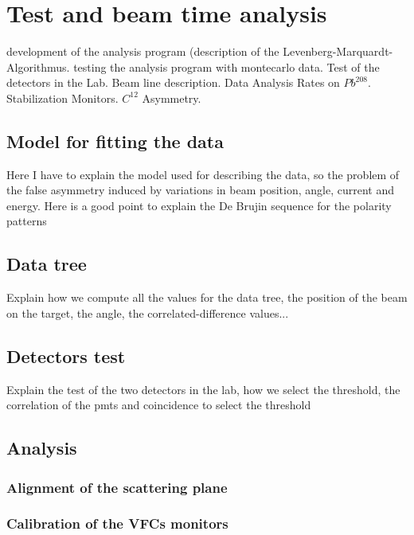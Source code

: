 \chapter{Test and beam time analysis} \label{analysis}

\begin{outline}[enumerate]
\1 development of the analysis program (description of the Levenberg-Marquardt-Algorithmus.
\1 testing the analysis program with montecarlo data.
\1 Test of the detectors in the Lab.
\1 Beam line description.
\1 Data Analysis
	\2 Rates on $Pb^{208}$.
	\2 Stabilization Monitors.
	\2 $C^{12}$ Asymmetry.
\end{outline}

\section{Model for fitting the data}
Here I have to explain the model used for describing the data, so the problem of the false asymmetry induced by variations in beam position, angle, current and energy. Here is a good point to explain the De Brujin sequence for the polarity patterns

\section{Data tree}
Explain how we compute all the values for the data tree, the position of the beam on the target, the angle, the correlated-difference values...

\section{Detectors test}
Explain the test of the two detectors in the lab, how we select the threshold, the correlation of the pmts and coincidence to select the threshold

\section{Analysis}

\subsection{Alignment of the scattering plane}

\subsection{Calibration of the VFCs monitors}

